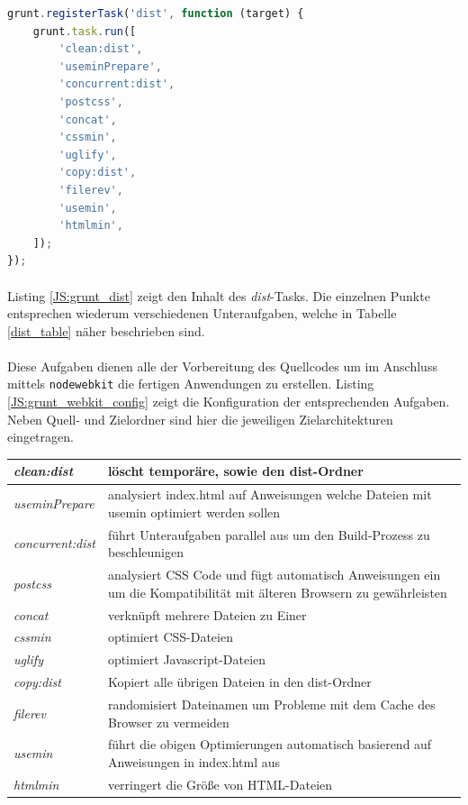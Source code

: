 \newpage
\begin{lstlisting}[language=JavaScript,label=JS:grunt_dist,caption=grunt dist-Task]
grunt.registerTask('dist', function (target) {
	grunt.task.run([
		'clean:dist',
		'useminPrepare',
		'concurrent:dist',
		'postcss',
		'concat',
		'cssmin',
		'uglify',
		'copy:dist',
		'filerev',
		'usemin',
		'htmlmin',
	]);
});
\end{lstlisting}

\paragraph{}
Listing \ref{JS:grunt_dist} zeigt den Inhalt des \textit{dist}-Tasks.
Die einzelnen Punkte entsprechen wiederum verschiedenen Unteraufgaben, welche in Tabelle \ref{dist_table} näher beschrieben sind.

\paragraph{}
Diese Aufgaben dienen alle der Vorbereitung des Quellcodes um im Anschluss mittels \texttt{nodewebkit} die fertigen Anwendungen zu erstellen.
Listing \ref{JS:grunt_webkit_config} zeigt die Konfiguration der entsprechenden Aufgaben.
Neben Quell- und Zielordner sind hier die jeweiligen Zielarchitekturen eingetragen.

\begin{tabularx}{0.92\textwidth}{lX}
	\textit{clean:dist} & löscht temporäre, sowie den dist-Ordner\\ \hline
	\textit{useminPrepare} & analysiert index.html auf Anweisungen welche Dateien mit usemin optimiert werden sollen\\ \hline
	\textit{concurrent:dist} & führt Unteraufgaben parallel aus um den Build-Prozess zu beschleunigen\\ \hline
	\textit{postcss} & analysiert CSS Code und fügt automatisch Anweisungen ein um die Kompatibilität mit älteren Browsern zu gewährleisten\\ \hline
	\textit{concat} & verknüpft mehrere Dateien zu Einer\\ \hline
	\textit{cssmin} & optimiert CSS-Dateien\\ \hline
	\textit{uglify} & optimiert Javascript-Dateien\\ \hline
	\textit{copy:dist} & Kopiert alle übrigen Dateien in den dist-Ordner\\ \hline
	\textit{filerev} & randomisiert Dateinamen um Probleme mit dem Cache des Browser zu vermeiden\\ \hline
	\textit{usemin} & führt die obigen Optimierungen automatisch basierend auf Anweisungen in index.html aus\\ \hline
	\textit{htmlmin} & verringert die Größe von HTML-Dateien\\ \hline
\end{tabularx}
\label{dist_table}
\vspace*{1cm}


